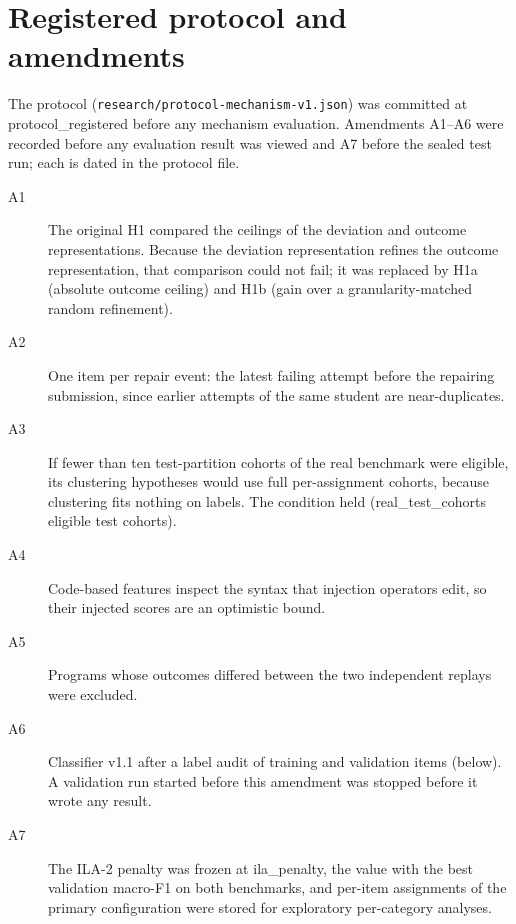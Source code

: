 \section{Registered protocol and amendments}\label{app:protocol}

The protocol (\texttt{research/protocol-mechanism-v1.json}) was committed at {{protocol_registered}} before any mechanism evaluation. Amendments A1--A6 were recorded before any evaluation result was viewed and A7 before the sealed test run; each is dated in the protocol file.
\begin{description}
\item[A1] The original H1 compared the ceilings of the deviation and outcome representations. Because the deviation representation refines the outcome representation, that comparison could not fail; it was replaced by H1a (absolute outcome ceiling) and H1b (gain over a granularity-matched random refinement).
\item[A2] One item per repair event: the latest failing attempt before the repairing submission, since earlier attempts of the same student are near-duplicates.
\item[A3] If fewer than ten test-partition cohorts of the real benchmark were eligible, its clustering hypotheses would use full per-assignment cohorts, because clustering fits nothing on labels. The condition held ({{real_test_cohorts}} eligible test cohorts).
\item[A4] Code-based features inspect the syntax that injection operators edit, so their injected scores are an optimistic bound.
\item[A5] Programs whose outcomes differed between the two independent replays were excluded.
\item[A6] Classifier v1.1 after a label audit of training and validation items (below). A validation run started before this amendment was stopped before it wrote any result.
\item[A7] The ILA-2 penalty was frozen at {{ila_penalty}}, the value with the best validation macro-F1 on both benchmarks, and per-item assignments of the primary configuration were stored for exploratory per-category analyses.
\end{description}

